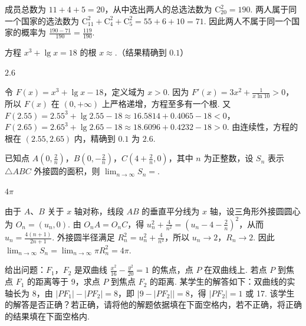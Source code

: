 \begin{solution}
成员总数为 \(11+4+5=20\)，从中选出两人的总选法数为 \(\mathrm C_{20}^{2}=190\). 两人属于同一个国家的选法数为 \(\mathrm C_{11}^{2}+\mathrm C_{4}^{2}+\mathrm C_{5}^{2}=55+6+10=71\). 因此两人不属于同一个国家的概率为 \(\frac{190-71}{190}=\frac{119}{190}\).
\end{solution}

\begin{problem}
方程 \(x^{3} + \lg x = 18\) 的根 \(x \approx\)\fillinblank{}.（结果精确到 \(0.1\)）
\end{problem}

\begin{answer}
\(2.6\)
\end{answer}

\begin{solution}
令 \(F(x)=x^3+\lg x-18\)，定义域为 \(x>0\). 因为 \(F'(x)=3x^2+\frac{1}{x\ln10}>0\)，所以 \(F(x)\) 在 \((0,+\infty)\) 上严格递增，方程至多有一个根. 又 \(F(2.55)=2.55^3+\lg2.55-18\approx16.5814+0.4065-18<0\)，\(F(2.65)=2.65^3+\lg2.65-18\approx18.6096+0.4232-18>0\). 由连续性，方程的根在 \((2.55,2.65)\) 内，精确到 \(0.1\) 为 \(2.6\).
\end{solution}

\begin{problem}
已知点 \(A\left(0, \frac{2}{n}\right)\)，\(B\left(0, -\frac{2}{n}\right)\)，\(C\left(4 + \frac{2}{n}, 0\right)\)，其中 \(n\) 为正整数，设 \(S_{n}\) 表示 \(\triangle ABC\) 外接圆的面积，则 \(\displaystyle\lim_{n \to \infty} S_{n} = \)\fillinblank{}.
\end{problem}

\begin{answer}
\(4\pi\)
\end{answer}

\begin{solution}
由于 \(A\)、\(B\) 关于 \(x\) 轴对称，线段 \(AB\) 的垂直平分线为 \(x\) 轴，设三角形外接圆圆心为 \(O_n=(u_n,0)\). 由 \(O_nA=O_nC\)，得 \(u_n^2+\frac{4}{n^2}=\left(u_n-4-\frac{2}{n}\right)^2\)，从而 \(u_n=\frac{4(n+1)}{2n+1}\). 外接圆半径满足 \(R_n^2=u_n^2+\frac{4}{n^2}\)，所以 \(u_n\to2\)，\(R_n\to2\). 因此 \(\lim_{n\to\infty}S_n=\lim_{n\to\infty}\pi R_n^2=4\pi\).
\end{solution}

\begin{problem}
给出问题：\(F_{1}\)，\(F_{2}\) 是双曲线 \(\frac{x^{2}}{16} - \frac{y^{2}}{20} = 1\) 的焦点，点 \(P\) 在双曲线上. 若点 \(P\) 到焦点 \(F_{1}\) 的距离等于 9，求点 \(P\) 到焦点 \(F_{2}\) 的距离. 某学生的解答如下：双曲线的实轴长为 8，由 \(\left|PF_{1}\right| - \left|PF_{2}\right| = 8\)，即 \(\left|9 - \left|PF_{2}\right|\right| = 8\)，得 \(\left|PF_{2}\right| = 1\) 或 17. 该学生的解答是否正确？若正确，请将他的解题依据填在下面空格内，若不正确，将正确的结果填在下面空格内\fillinblank{}.
\end{problem}

